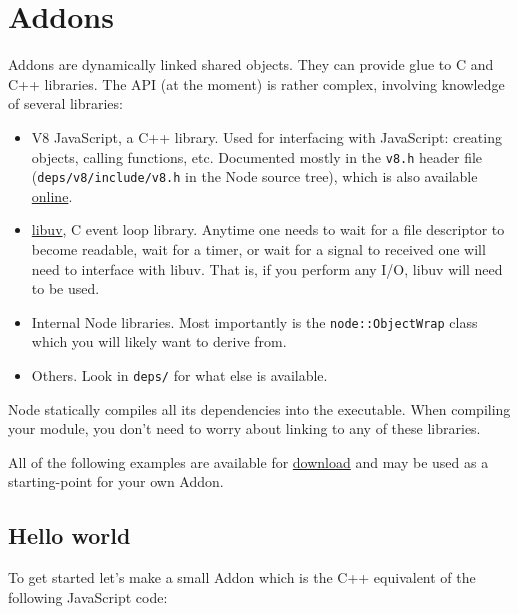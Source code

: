 \section{Addons}

Addons are dynamically linked shared objects. They can provide glue to C
and C++ libraries. The API (at the moment) is rather complex, involving
knowledge of several libraries:

\begin{itemize}
\item
  V8 JavaScript, a C++ library. Used for interfacing with JavaScript:
  creating objects, calling functions, etc. Documented mostly in the
  \texttt{v8.h} header file (\texttt{deps/v8/include/v8.h} in the Node
  source tree), which is also available
  \href{http://izs.me/v8-docs/main.html}{online}.
\item
  \href{https://github.com/joyent/libuv}{libuv}, C event loop library.
  Anytime one needs to wait for a file descriptor to become readable,
  wait for a timer, or wait for a signal to received one will need to
  interface with libuv. That is, if you perform any I/O, libuv will need
  to be used.
\item
  Internal Node libraries. Most importantly is the
  \texttt{node::ObjectWrap} class which you will likely want to derive
  from.
\item
  Others. Look in \texttt{deps/} for what else is available.
\end{itemize}

Node statically compiles all its dependencies into the executable. When
compiling your module, you don't need to worry about linking to any of
these libraries.

All of the following examples are available for
\href{https://github.com/rvagg/node-addon-examples}{download} and may be
used as a starting-point for your own Addon.

\subsection{Hello world}

To get started let's make a small Addon which is the C++ equivalent of
the following JavaScript code:

\begin{Shaded}
\begin{Highlighting}[]
 \NormalTok{= }\NormalTok{() \{ } \NormalTok{; \};}
\end{Highlighting}
\end{Shaded}

